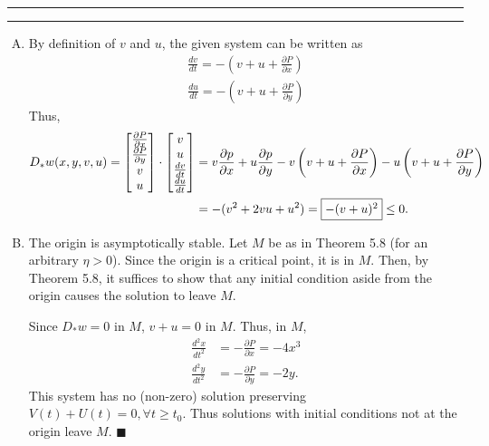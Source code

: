 \documentclass[11pt]{article}
\newcounter{questionCounter}
\newcounter{partCounter}[questionCounter]
\newenvironment{question}[2][\arabic{questionCounter}]{%
    \setcounter{partCounter}{0}%
    \vspace{.25in} \hrule \vspace{0.5em}%
        \noindent{\bf #2}%
    \vspace{0.8em} \hrule \vspace{.10in}%
    \addtocounter{questionCounter}{1}%
}{}
\renewcommand{\qed}{\quad $\blacksquare$}
\begin{document}
\newpage
\begin{question}{Problem 4}
\begin{enumerate}[A)]
\item By definition of $v$ and $u$, the given system can be written as
\begin{align*}
\frac{dv}{dt} = - \left( v + u + \frac{\partial P}{\partial x} \right)  \\
\frac{du}{dt} = - \left( v + u + \frac{\partial P}{\partial y} \right)
\end{align*}
Thus,
\begin{align*}
D_*w(x,y,v,u)
    =   \begin{bmatrix}
            \frac{\partial P}{\partial x}   \\
            \frac{\partial P}{\partial y}   \\
            v                               \\
            u
        \end{bmatrix}
  \cdot \begin{bmatrix}
            v               \\
            u               \\
            \frac{dv}{dt}   \\
            \frac{du}{dt}   \\
        \end{bmatrix}
 &  =   v\frac{\partial p}{\partial x} + u\frac{\partial p}{\partial y}
    -   v\left( v + u + \frac{\partial P}{\partial x} \right)
    -   u\left( v + u + \frac{\partial P}{\partial y} \right)   \\
 &  =   -(v^2 + 2vu + u^2) = \mbox{\fbox{$-(v + u)^2$}} \leq 0.
\end{align*}
 
\item The origin is asymptotically stable. Let $M$ be as in Theorem 5.8 (for an
arbitrary $\eta > 0$). Since the origin is a critical point, it is in $M$.
Then, by Theorem 5.8, it suffices to show that any initial condition aside from
the origin causes the solution to leave $M$.

Since $D_*w = 0$ in $M$, $v + u = 0$ in $M$. Thus, in $M$,
\begin{align*}
\frac{d^2x}{dt^2} & = - \frac{\partial P}{\partial x} = -4x^3   \\
\frac{d^2y}{dt^2} & = - \frac{\partial P}{\partial y} = -2y.
\end{align*}
This system has no (non-zero) solution preserving
$V(t) + U(t) = 0, \forall t \geq t_0$. Thus solutions with initial conditions
not at the origin leave $M$. \qed



\end{enumerate}
\end{question}
\end{document}
